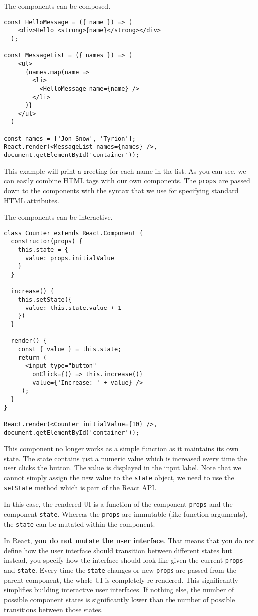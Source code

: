 The components can be composed. 

\begin{verbatim}
const HelloMessage = ({ name }) => (
    <div>Hello <strong>{name}</strong></div>
  );
  
const MessageList = ({ names }) => (
    <ul>
      {names.map(name => 
        <li>
          <HelloMessage name={name} />
        </li>
      )}
    </ul>
  )

const names = ['Jon Snow', 'Tyrion'];
React.render(<MessageList names={names} />, document.getElementById('container'));
\end{verbatim}

This example will print a greeting for each name in the list. As you can see, we can easily combine HTML tags with our own components. The \texttt{props} are passed down to the components with the syntax that we use for specifying  standard HTML attributes.

The components can be interactive.

\begin{verbatim}
class Counter extends React.Component {
  constructor(props) {
    this.state = {
      value: props.initialValue
    }
  }
  
  increase() {
    this.setState({
      value: this.state.value + 1
    })
  }
  
  render() {
    const { value } = this.state;
    return (
      <input type="button" 
        onClick={() => this.increase()} 
        value={'Increase: ' + value} />
     );
  }
} 

React.render(<Counter initialValue={10} />, document.getElementById('container'));
\end{verbatim}

This component no longer works as a simple function as it maintains its own state. The state contains just a numeric value which is increased every time the user clicks the button. The value is displayed in the input label. Note that we cannot simply assign the new value to the \texttt{state} object, we need to use the \texttt{setState} method which is part of the React API.

In this case, the rendered UI is a function of the component \texttt{props} and the component \texttt{state}. Whereas the \texttt{props} are immutable (like function arguments), the \texttt{state} can be mutated within the component.

In React, \textbf{you do not mutate the user interface}. That means that you do not define how the user interface should transition between different states but instead, you specify how the interface should look like given the current \texttt{props} and \texttt{state}. Every time the \texttt{state} changes or new \texttt{props} are passed from the parent component, the whole UI is completely re-rendered. This significantly simplifies building interactive user interfaces. If nothing else, the number of possible component states is significantly lower than the number of possible transitions between those states.

